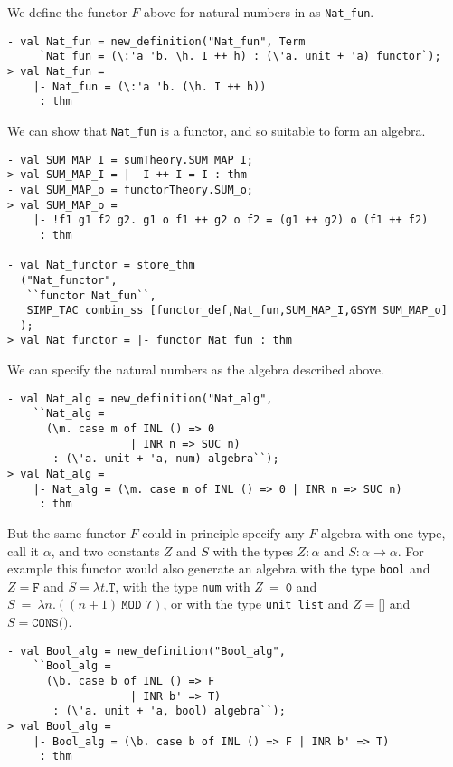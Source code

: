 We define the functor $F$ above for natural numbers in \HOLW{} as \texttt{Nat\_fun}.
\begin{session}
\begin{verbatim}
- val Nat_fun = new_definition("Nat_fun", Term
     `Nat_fun = (\:'a 'b. \h. I ++ h) : (\'a. unit + 'a) functor`);
> val Nat_fun =
    |- Nat_fun = (\:'a 'b. (\h. I ++ h))
     : thm
\end{verbatim}
\end{session}

We can show that \texttt{Nat\_fun} is a functor, and so suitable to form an algebra.
\begin{session}
\begin{verbatim}
- val SUM_MAP_I = sumTheory.SUM_MAP_I;
> val SUM_MAP_I = |- I ++ I = I : thm
- val SUM_MAP_o = functorTheory.SUM_o;
> val SUM_MAP_o =
    |- !f1 g1 f2 g2. g1 o f1 ++ g2 o f2 = (g1 ++ g2) o (f1 ++ f2)
     : thm

- val Nat_functor = store_thm
  ("Nat_functor",
   ``functor Nat_fun``,
   SIMP_TAC combin_ss [functor_def,Nat_fun,SUM_MAP_I,GSYM SUM_MAP_o]
  );
> val Nat_functor = |- functor Nat_fun : thm
\end{verbatim}
\end{session}

We can specify the natural numbers as the algebra described above.
\begin{session}
\begin{verbatim}
- val Nat_alg = new_definition("Nat_alg",
    ``Nat_alg =
      (\m. case m of INL () => 0
                   | INR n => SUC n)
       : (\'a. unit + 'a, num) algebra``);
> val Nat_alg =
    |- Nat_alg = (\m. case m of INL () => 0 | INR n => SUC n)
     : thm
\end{verbatim}
\end{session}

But the same functor $F$ could in principle specify any $F$-algebra with 
one type, call it $\alpha$, and two constants $Z$ and $S$ with the types $Z : \alpha$ and
$S : \alpha \rightarrow \alpha$. For example this functor would also generate an algebra
with the type \texttt{bool} and $Z = \texttt{F}$ and $S = \lambda t.\texttt{T}$,
with the type \texttt{num} with $Z~=~\texttt{0}$ and $S~=~\lambda n.((n + 1)~\texttt{MOD~7})$,
or with the type \texttt{unit list} and $Z = \texttt{[]}$ and
$S = \texttt{CONS()}$.
\begin{session}
\begin{verbatim}
- val Bool_alg = new_definition("Bool_alg",
    ``Bool_alg =
      (\b. case b of INL () => F
                   | INR b' => T)
       : (\'a. unit + 'a, bool) algebra``);
> val Bool_alg =
    |- Bool_alg = (\b. case b of INL () => F | INR b' => T)
     : thm
\end{verbatim}
\end{session}

